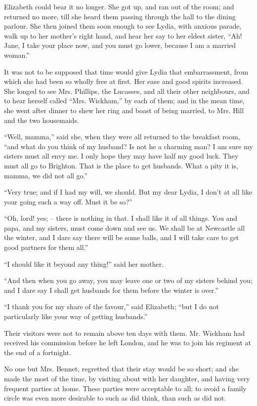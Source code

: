 Elizabeth could bear it no longer. She got up, and ran
out of the room; and returned no more, till she heard
them passing through the hall to the dining parlour.
She then joined them soon enough to see Lydia, with
anxious parade, walk up to her mother’s right hand, and
hear her say to her eldest sister, “Ah! Jane, I take
your place now, and you must go lower, because I am a
married woman.”

It was not to be supposed that time would give Lydia
that embarrassment, from which she had been so wholly
free at first. Her ease and good spirits increased. She
longed to see Mrs. Phillips, the Lucasses, and all their
other neighbours, and to hear herself called “Mrs. Wickham,”
by each of them; and in the mean time, she went
after dinner to shew her ring and boast of being married,
to Mrs. Hill and the two housemaids.

“Well, mamma,” said she, when they were all returned
to the breakfast room, “and what do you think of my
husband? Is not he a charming man? I am sure my
sisters must all envy me. I only hope they may have
half my good luck. They must all go to Brighton. That
is the place to get husbands. What a pity it is, mamma,
we did not all go.”

“Very true; and if I had my will, we should. But
my dear Lydia, I don’t at all like your going such a way
off. Must it be so?”

“Oh, lord! yes; -- there is nothing in that. I shall
like it of all things. You and papa, and my sisters, must
come down and see us. We shall be at Newcastle all the
winter, and I dare say there will be some balls, and I will
take care to get good partners for them all.”

“I should like it beyond any thing!” said her mother.

“And then when you go away, you may leave one
or two of my sisters behind you; and I dare say I shall
get husbands for them before the winter is over.”

“I thank you for my share of the favour,” said Elizabeth;
“but I do not particularly like your way of getting
husbands.”

Their visitors were not to remain above ten days with
them. Mr. Wickham had received his commission before
he left London, and he was to join his regiment at the end
of a fortnight.

No one but Mrs. Bennet, regretted that their stay
would be so short; and she made the most of the time,
by visiting about with her daughter, and having very
frequent parties at home. These parties were acceptable
to all; to avoid a family circle was even more desirable
to such as did think, than such as did not.

